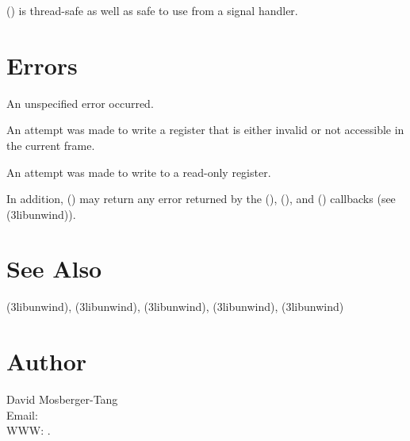 \documentclass{article}
\begin{document}
() is thread-safe as well as safe to use
from a signal handler.

\section{Errors}

\begin{Description}
\item[\Const{UNW\_EUNSPEC}] An unspecified error occurred.
\item[\Const{UNW\_EBADREG}] An attempt was made to write a register
  that is either invalid or not accessible in the current frame.
\item[\Const{UNW\_EREADONLY}] An attempt was made to write to a
  read-only register.
\end{Description}
In addition, () may return any error returned by
the (), (), and
() callbacks (see
(3libunwind)).

\section{See Also}

(3libunwind),
(3libunwind),
(3libunwind),
(3libunwind),
(3libunwind)

\section{Author}

\noindent
David Mosberger-Tang\\
Email: \\
WWW: .
\LatexManEnd
\end{document}
